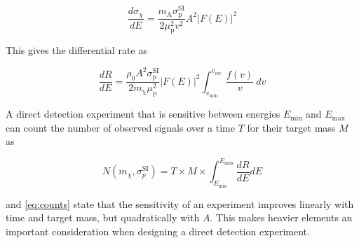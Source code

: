 \begin{equation}
\frac{d \sigma_{\chi}}{dE} = \frac{m_{\mathrm{A}} \sigma_{\mathrm{p}}^{\mathrm{SI}}}{2 \mu_{\mathrm{p}}^{2} v^{2}}
 A^{2} \big| F(E) \big |^{2}
\end{equation}

\noindent This gives the differential rate as 

\begin{equation}
\label{eq:dr_de_final}
\frac{dR}{dE} = \frac{\rho_{0} A^{2} \sigma_{\mathrm{p}}^{\mathrm{SI}}}{2 m_{\mathrm{\chi}} \mu_{\mathrm{p}}^{2}}
  \big| F(E) \big |^{2} \int_{v_{\mathrm{min}}}^{v_{\mathrm{esc}}}
\frac{f(v)}{v}\ dv
\end{equation}

\noindent A direct detection experiment that is sensitive between energies $E_{\mathrm{min}}$ and $E_{\mathrm{max}}$ can count the number
of observed signals over a time $T$ for their target mass $M$ as

\begin{equation} \label{eq:counts}
N ( m_{\chi}, \sigma_{p}^{\mathrm{SI}}) = T \times M \times \int_{E_{\mathrm{min}}}^{E_{\mathrm{max}}} \frac{dR}{dE} dE
\end{equation}

\noindent {} and \eqref{eq:counts} state that the sensitivity of an experiment improves linearly with time and
target mass, but quadratically with $A$.  This makes heavier elements an important consideration when designing a direct detection
experiment.












